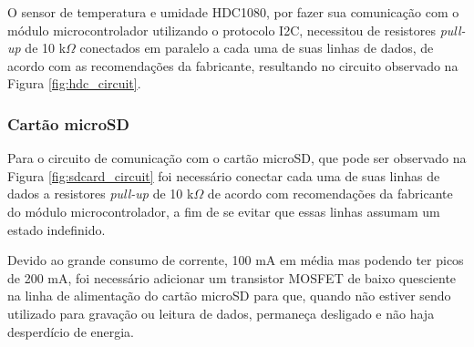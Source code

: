 \newpage


O sensor de temperatura e umidade HDC1080, por fazer sua comunicação com o módulo microcontrolador utilizando o protocolo \gls{I2C}, necessitou de resistores \textit{pull-up} de 10 k$\Omega$ conectados em paralelo a cada uma de suas linhas de dados, de acordo com as recomendações da fabricante, resultando no circuito observado na Figura \ref{fig:hdc_circuit}.

    \begin{figure}[h!]
            \captionsetup{width=7cm}
   \end{figure}  




\subsubsection{Cartão microSD}

Para o circuito de comunicação com o cartão microSD, que pode ser observado na Figura \ref{fig:sdcard_circuit} foi necessário conectar cada uma de suas linhas de dados a resistores \textit{pull-up} de 10 k$\Omega$ de acordo com recomendações da fabricante do módulo microcontrolador, a fim de se evitar que essas linhas assumam um estado indefinido. 

Devido ao grande consumo de corrente, 100 mA em média mas podendo ter picos de 200 mA, foi necessário adicionar um transistor MOSFET de baixo quesciente na linha de alimentação do cartão microSD para que, quando não estiver sendo utilizado para gravação ou leitura de dados, permaneça desligado e não haja desperdício de energia.

